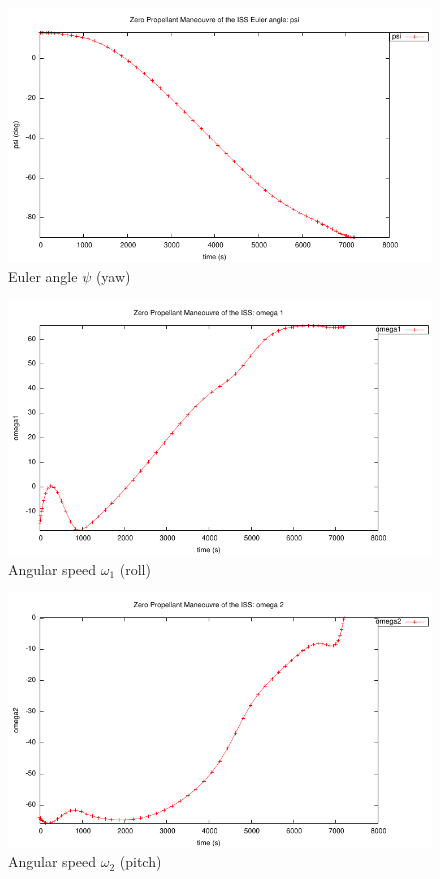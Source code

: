 \documentclass[a4paper,11pt]{report}    %
\begin{document}
\begin{figure}
  \centering 
  \includegraphics{../examples/zpm/zpm_psi}
  \caption{Euler angle $\psi$ (yaw)}
 \label{fig:zpm_psi}
\end{figure}

\begin{figure}
  \centering
  \includegraphics{../examples/zpm/zpm_omega1}
  \caption{Angular speed $\omega_1$ (roll)}
 \label{fig:zpm_omega1}
\end{figure}

\begin{figure}
  \centering
  \includegraphics{../examples/zpm/zpm_omega2}
  \caption{Angular speed $\omega_2$ (pitch)}
 \label{fig:zpm_omega2}
\end{figure}
\end{document}
